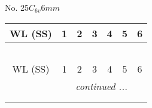 \documentclass[fleqn,9pt,landscape]{jsarticle}
\begin{document}
\newpage
No. 25\quad$C_{6v}$\quad$6mm$\quad[ hexagonal ]
\begin{center}
\renewcommand{\arraystretch}{1.2}
\begin{longtable}{ccccccc}
 \hline \hline
WL (SS) & 1 & 2 & 3 & 4 & 5 & 6 \\ \hline \endfirsthead

\multicolumn{6}{l}{\tablename\ \thetable{}} \\
 \hline \hline
WL (SS) & 1 & 2 & 3 & 4 & 5 & 6 \\ \hline \endhead

 \hline \hline
\multicolumn{6}{r}{\footnotesize\it continued ...} \\ \endfoot

 \hline \hline
\multicolumn{6}{r}{} \\ \endlastfoot


\end{longtable}
\end{center}
\end{document}
